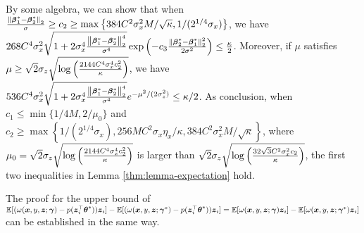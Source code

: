 By some algebra, we can show that when $\frac{\left\lVert\boldsymbol{\beta}_1^*-\boldsymbol{\beta}_2^*\right\rVert_2}{\sigma} \geq c_2 \geq \max\left\{384C^2\sigma_x^2M/\sqrt{\kappa}, 1/(2^{1/4}\sigma_x)\right\}$,  we have $268C^4\sigma_x^2\sqrt{ 1+2\sigma_x^4\frac{\left\lVert\boldsymbol{\beta}_1^*-\boldsymbol{\beta}_2^*\right\rVert_2^4}{\sigma^4}}\exp\left( -c_3\frac{\left\lVert\boldsymbol{\beta}_2^*-\boldsymbol{\beta}^*_1\right\rVert^2_{2}}{2\sigma^2} \right) \leq \frac{\kappa}{2}$. Moreover, if $\mu$ satisfies $\mu \geq  \sqrt{2}\sigma_z\sqrt{\log\left( \frac{2144C^4\sigma_x^4c_2^2}{\kappa} \right)}$, we have $536C^4\sigma_x^2\sqrt{ 1+2\sigma_x^4\frac{\left\lVert\boldsymbol{\beta}_1^*-\boldsymbol{\beta}_2^*\right\rVert_2^4}{\sigma^4}}e^{-\mu^2/(2\sigma_z^2)} \leq \kappa/2$. As conclusion, when $c_1 \leq \min\{1/4M, 2/\mu_0\}$  and $c_2 \geq \max\left\{1/(2^{1/4}\sigma_x), 256MC^2\sigma_x\eta_x/\kappa, 384C^2\sigma_x^2M/\sqrt{\kappa}\right\}$, where $\mu_0=\sqrt{2}\sigma_z\sqrt{\log\left( \frac{2144C^4\sigma_x^4c_2^2}{\kappa} \right)}$ is larger than  $\sqrt{2}\sigma_z\sqrt{\log\left( \frac{32\sqrt{3}C^2\sigma_x^2c_2}{\kappa} \right)}$, the first two inequalities in Lemma \ref{thm:lemma-expectation} hold.

The proof for the upper bound of $\mathbb{E}[ ( \omega(\boldsymbol{x}, y, \boldsymbol{z};\boldsymbol{\gamma}) - p(\boldsymbol{z}_i^\top\boldsymbol{\theta}^{*}) ) \boldsymbol{z}_i ] - \mathbb{E}[ (\omega(\boldsymbol{x}, y, \boldsymbol{z};\boldsymbol{\gamma}^*) - p(\boldsymbol{z}_i^\top\boldsymbol{\theta}^{*}) ) \boldsymbol{z}_i ]= \mathbb{E}[ \omega(\boldsymbol{x}, y, \boldsymbol{z};\boldsymbol{\gamma}) \boldsymbol{z}_i ] - \mathbb{E}[ \omega(\boldsymbol{x}, y, \boldsymbol{z};\boldsymbol{\gamma}^*) \boldsymbol{z}_i ]$ can be established in the same way.



